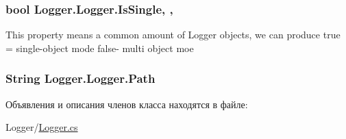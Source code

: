 \subsubsection[{Is\+Single}]{\setlength{\rightskip}{0pt plus 5cm}bool Logger.\+Logger.\+Is\+Single\hspace{0.3cm}{\ttfamily [static]}, {\ttfamily [get]}, {\ttfamily [set]}}\label{class_logger_1_1_logger_a4895fc0515058056ca5e6ec929b57d51}


This property means a common amount of Logger objects, we can produce true = single-\/object mode false-\/ multi object moe 

\hypertarget{class_logger_1_1_logger_aed778c812410fe2990563386ea12da16}{}
\subsubsection[{Path}]{\setlength{\rightskip}{0pt plus 5cm}String Logger.\+Logger.\+Path\hspace{0.3cm}{\ttfamily [get]}}\label{class_logger_1_1_logger_aed778c812410fe2990563386ea12da16}


Объявления и описания членов класса находятся в файле\+:\begin{DoxyCompactItemize}
\item 
Logger/\hyperlink{_logger_8cs}{Logger.\+cs}\end{DoxyCompactItemize}
